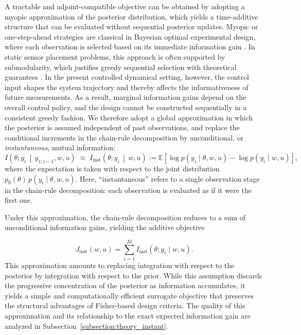 \documentclass[a4paper,11pt]{article}
\newcommand{\E}{\mathbb{E}}
\begin{document}
A tractable and adjoint-compatible objective can be obtained by adopting a myopic approximation of the posterior distribution, which yields a time-additive structure that can be evaluated without sequential posterior updates. Myopic or one-step-ahead strategies are classical in Bayesian optimal experimental design, where each observation is selected based on its immediate information gain \cite{Cavagnaro2010,Drovandi2014}. In static sensor placement problems, this approach is often supported by submodularity, which justifies greedy sequential selection with theoretical guarantees \cite{Krause2008}. In the present controlled dynamical setting, however, the control input shapes the system trajectory and thereby affects the informativeness of future measurements. As a result, marginal information gains depend on the overall control policy, and the design cannot be constructed sequentially in a consistent greedy fashion. We therefore adopt a global approximation in which the posterior is assumed independent of past observations, and replace the conditional increments in the chain-rule decomposition by unconditional, or \emph{instantaneous}, mutual information:
\begin{equation} \label{eq:I_inst_def}
  I\!\left(\theta; y_i \,\middle|\, y_{1:i-1}, w, u\right)
  \;\approx\;
  I_{\mathrm{inst}}\!\left(\theta; y_i \,\middle|\, w, u\right) :=
  \E\!\left[
    \log p\!\left(y_i \mid \theta, w, u\right)
    - \log p\!\left(y_i \mid w, u\right)
  \right],
\end{equation}
where the expectation is taken with respect to the joint distribution
\( p_0(\theta)\, p(y_i \mid \theta, w, u) \). Here, ``instantaneous'' refers to a single observation stage in
the chain-rule decomposition: each observation is evaluated as if it were the
first one.


Under this approximation, the chain-rule decomposition reduces to a sum of unconditional information gains, yielding the additive objective

\[
  J_{\mathrm{inst}}(w, u)
  =
  \sum_{i=1}^M
  I_{\mathrm{inst}}\!\left(\theta; y_i \mid w, u\right).
\]
This approximation amounts to replacing integration with respect to the posterior
by integration with respect to the prior. While this assumption discards the
progressive concentration of the posterior as information accumulates, it yields a
simple and computationally efficient surrogate objective that preserves the
structural advantages of Fisher-based design criteria. The quality of this
approximation and its relationship to the exact expected information gain are
analyzed in Subsection~\ref{subsection:theory_instant}.
\end{document}
